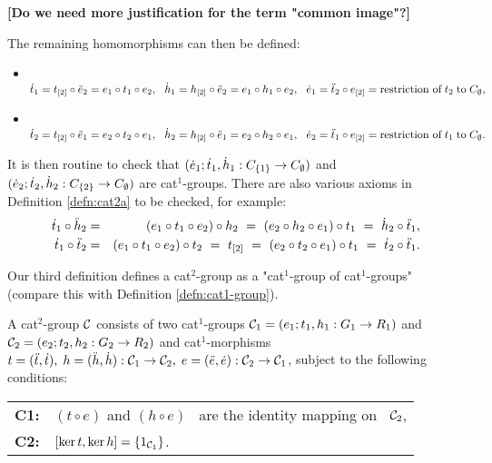 \noindent
{\bf [Do we need more justification for the term "common image"?]}

\medskip\noindent
The remaining homomorphisms can then be defined: 
\begin{itemize}
\item~ 
$
\dot{t}_1 = t_{[2]} \circ \ddot{e}_2 = e_1 \circ t_1 \circ e_2,~~ 
\dot{h}_1 = h_{[2]} \circ \ddot{e}_2 = e_1 \circ h_1 \circ e_2,~~ 
\dot{e}_1 = \ddot{t}_2 \circ e_{[2]} 
      = \mbox{restriction of}\; t_2\; \mbox{to}\; C_{\emptyset}, 
$
\item~ 
$
\dot{t}_2 = t_{[2]} \circ \ddot{e}_1 = e_2 \circ t_2 \circ e_1,~~ 
\dot{h}_2 = h_{[2]} \circ \ddot{e}_1 = e_2 \circ h_2 \circ e_1,~~ 
\dot{e}_2 = \ddot{t}_1 \circ e_{[2]} 
      = \mbox{restriction of}\; t_1\; \mbox{to}\; C_{\emptyset}. 
$
\end{itemize} 
It is then routine to check that 
$(\dot{e}_1;\dot{t}_1,\dot{h}_1 : C_{\{1\}} \to C_{\emptyset})$
and
$(\dot{e}_2;\dot{t}_2,\dot{h}_2 : C_{\{2\}} \to C_{\emptyset})$
are cat$^1$-groups. 
There are also various axioms in Definition \ref{defn:cat2a} to be checked, 
for example: 
\begin{eqnarray*}
\dot{t}_1\circ\ddot{h}_2 &=& 
  (e_1 \circ t_1 \circ e_2) \circ h_2 
~=~ (e_2 \circ h_2 \circ e_1) \circ t_1 
~=~ \dot{h}_2\circ\ddot{t}_1, \\
\dot{t}_1\circ\ddot{t}_2 &=& 
  (e_1 \circ t_1 \circ e_2) \circ t_2 
~=~ t_{[2]} 
~=~ (e_2 \circ t_2 \circ e_1) \circ t_1 
~=~ \dot{t}_2\circ\ddot{t}_1. \\
\end{eqnarray*}

Our third definition defines a cat$^2$-group as a 
"cat$^1$-group of cat$^1$-groups" 
(compare this with Definition \ref{defn:cat1-group}). 

\begin{defn} \label{defn:cat2c} 
A cat$^2$-group $\mathcal{C}$ consists of two cat$^1$-groups 
$\mathcal{C}_1 = (e_1;t_1,h_1 : G_1 \to R_1)$ and 
$\mathcal{C}_2 = (e_2;t_2,h_2 : G_2 \to R_2)$ and cat$^1$-morphisms
$t = (\ddot{t},\dot{t}),\; h = (\ddot{h},\dot{h}) : \mathcal{C}_1 \to \mathcal{C}_2,\; 
e = (\ddot{e},\dot{e}) : \mathcal{C}_2 \to \mathcal{C}_1$,  
subject to the following conditions: 
\begin{center}
\begin{tabular}{r l}
\textbf{C1:}  &  $(t \circ e)$ and $(h \circ e)$~ 
                 are the identity mapping on~ $\mathcal{C}_2$, \\
\textbf{C2:}  &  $[\ker t, \ker h] = \{ 1_{\mathcal{C}_1} \}$.
\end{tabular}
\end{center}
\end{defn}

